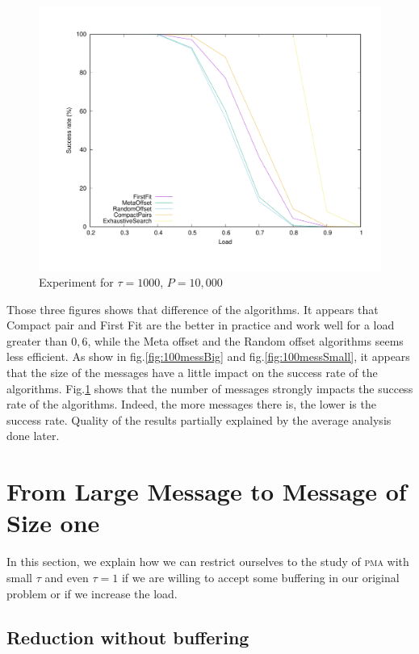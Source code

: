 \documentclass[10pt, conference, letterpaper]{IEEEtran}
\newcommand\pma{\textsc{pma}\xspace}
\begin{document}
\begin{figure}
\begin{center}
\includegraphics[scale=0.3]{10mess}
\end{center}
\caption{Experiment for $\tau = 1000$, $P=10,000$}
\label{fig:10mess}
\end{figure}

Those three figures shows that difference of the algorithms. It appears that Compact pair and First Fit are the better in practice and work well for a load greater than $0,6$, while the Meta offset and the Random offset algorithms seems less efficient.
As show in fig.\ref{fig:100messBig} and fig.\ref{fig:100messSmall}, it appears that the size of the messages have a little impact on the success rate of the algorithms.
Fig.\ref{fig:10mess} shows that the number of messages strongly impacts the success rate of the algorithms. Indeed, the more messages there is, the lower is the success rate.
Quality of the results partially explained by the average analysis done later.
 

\section{From Large Message to Message of Size one}\label{sec:reduction}

In this section, we explain how we can restrict ourselves to the study of \pma
with small $\tau$ and even $\tau = 1$ if we are willing to accept some buffering in our original problem or if we increase the load.


\subsection{Reduction without buffering}
\end{document}
